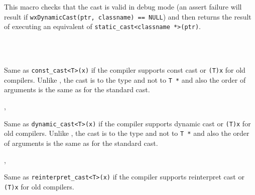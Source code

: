 


\label{wxstaticcast}


This macro checks that the cast is valid in debug mode (an assert failure will
result if {\tt wxDynamicCast(ptr, classname) == NULL}) and then returns the
result of executing an equivalent of {\tt static\_cast<classname *>(ptr)}.


\\
\\


\label{wxconstcastraw}


Same as \texttt{const\_cast<T>(x)} if the compiler supports const cast or
\texttt{(T)x} for old compilers. Unlike ,
the cast is to the type  and not to \texttt{T *} and also the order of
arguments is the same as for the standard cast.


,\\


\label{wxdynamiccastraw}


Same as \texttt{dynamic\_cast<T>(x)} if the compiler supports dynamic cast or
\texttt{(T)x} for old compilers. Unlike ,
the cast is to the type  and not to \texttt{T *} and also the order of
arguments is the same as for the standard cast.


,\\


\label{wxreinterpretcastraw}


Same as \texttt{reinterpret\_cast<T>(x)} if the compiler supports reinterpret cast or
\texttt{(T)x} for old compilers.

